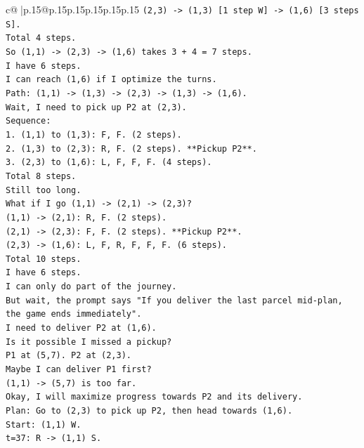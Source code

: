 \documentclass{article}
\begin{document}
{\begin{supertabular}{c@{$\;$}|p{.15\linewidth}@{}p{.15\linewidth}p{.15\linewidth}p{.15\linewidth}p{.15\linewidth}p{.15\linewidth}}
{{{\texttt{(2,3) {-}> (1,3) {[}1 step W{]} {-}> (1,6) {[}3 steps S{]}.} \\
\texttt{Total 4 steps.} \\
\texttt{So (1,1) {-}> (2,3) {-}> (1,6) takes 3 + 4 = 7 steps.} \\
\texttt{I have 6 steps.} \\
\texttt{I can reach (1,6) if I optimize the turns.} \\
\texttt{Path: (1,1) {-}> (1,3) {-}> (2,3) {-}> (1,3) {-}> (1,6).} \\
\texttt{Wait, I need to pick up P2 at (2,3).} \\
\texttt{Sequence:} \\
\texttt{1. (1,1) to (1,3): F, F. (2 steps).} \\
\texttt{2. (1,3) to (2,3): R, F. (2 steps). **Pickup P2**.} \\
\texttt{3. (2,3) to (1,6): L, F, F, F. (4 steps).} \\
\texttt{Total 8 steps.} \\
\texttt{Still too long.} \\
\texttt{What if I go (1,1) {-}> (2,1) {-}> (2,3)?} \\
\texttt{(1,1) {-}> (2,1): R, F. (2 steps).} \\
\texttt{(2,1) {-}> (2,3): F, F. (2 steps). **Pickup P2**.} \\
\texttt{(2,3) {-}> (1,6): L, F, R, F, F, F. (6 steps).} \\
\texttt{Total 10 steps.} \\
\texttt{I have 6 steps.} \\
\texttt{I can only do part of the journey.} \\
\texttt{But wait, the prompt says "If you deliver the last parcel mid{-}plan, the game ends immediately".} \\
\texttt{I need to deliver P2 at (1,6).} \\
\texttt{Is it possible I missed a pickup?} \\
\texttt{P1 at (5,7). P2 at (2,3).} \\
\texttt{Maybe I can deliver P1 first?} \\
\texttt{(1,1) {-}> (5,7) is too far.} \\
\texttt{Okay, I will maximize progress towards P2 and its delivery.} \\
\texttt{Plan: Go to (2,3) to pick up P2, then head towards (1,6).} \\
\texttt{Start: (1,1) W.} \\
\texttt{t=37: R {-}> (1,1) S.} \\
}}}
\end{supertabular}}
\end{document}

